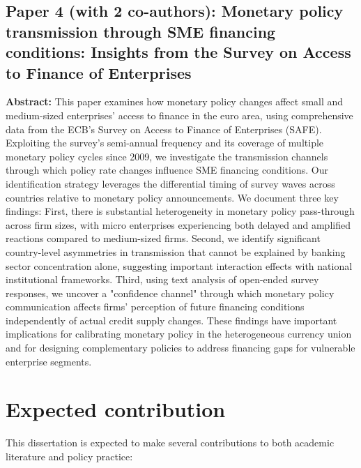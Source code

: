 \documentclass[11pt,a4paper]{article}
\begin{document}
\subsection*{Paper 4 (with 2 co-authors): Monetary policy transmission through SME financing conditions: Insights from the Survey on Access to Finance of Enterprises}
\textbf{Abstract:} This paper examines how monetary policy changes affect small and medium-sized enterprises' access to finance in the euro area, using comprehensive data from the ECB's Survey on Access to Finance of Enterprises (SAFE). Exploiting the survey's semi-annual frequency and its coverage of multiple monetary policy cycles since 2009, we investigate the transmission channels through which policy rate changes influence SME financing conditions. Our identification strategy leverages the differential timing of survey waves across countries relative to monetary policy announcements. We document three key findings: First, there is substantial heterogeneity in monetary policy pass-through across firm sizes, with micro enterprises experiencing both delayed and amplified reactions compared to medium-sized firms. Second, we identify significant country-level asymmetries in transmission that cannot be explained by banking sector concentration alone, suggesting important interaction effects with national institutional frameworks. Third, using text analysis of open-ended survey responses, we uncover a "confidence channel" through which monetary policy communication affects firms' perception of future financing conditions independently of actual credit supply changes. These findings have important implications for calibrating monetary policy in the heterogeneous currency union and for designing complementary policies to address financing gaps for vulnerable enterprise segments.

\section*{Expected contribution}
This dissertation is expected to make several contributions to both academic literature and policy practice:
\end{document}
